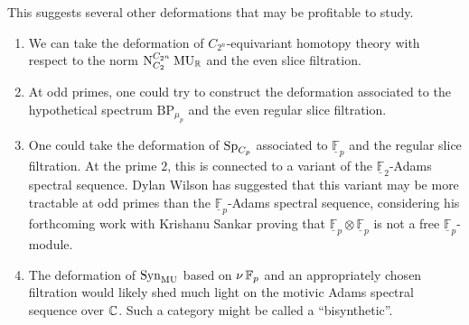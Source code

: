 This suggests several other deformations that may be profitable to study.
\begin{enumerate}
\item We can take the deformation of $C_{2^n}$-equivariant homotopy theory with respect to the norm $\mathrm{N}_{C_2} ^{C_{2^n}} \operatorname{\mathrm{MU}}_{\mathbb{R}}$ and the even slice filtration.
\item At odd primes, one could try to construct the deformation associated to the hypothetical spectrum $\mathrm{BP}_{\mu_p}$ and the even regular slice filtration.
\item One could take the deformation of $\operatorname{\mathrm{Sp}}_{C_p}$ associated to $\underline{\mathbb{F}}_p$ and the regular slice filtration.
At the prime $2$, this is connected to a variant of the $\underline{\mathbb{F}}_2$-Adams spectral sequence.
Dylan Wilson has suggested that this variant may be more tractable at odd primes than the $\underline{\mathbb{F}}_p$-Adams spectral sequence, considering his forthcoming work with Krishanu Sankar proving that $\underline{\mathbb{F}}_p \otimes \underline{\mathbb{F}}_p$ is not a free $\underline{\mathbb{F}}_p$-module.
\item The deformation of $\mathrm{Syn}_{\operatorname{\mathrm{MU}}}$ based on $\nu \operatorname{\mathbb{F}}_p$ and an appropriately chosen filtration would likely shed much light on the motivic Adams spectral sequence over $\mathbb{C}$. Such a category might be called a ``bisynthetic''.
\end{enumerate}


%


